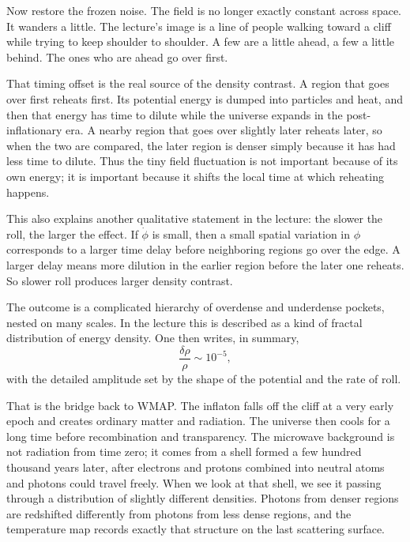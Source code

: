 Now restore the frozen noise. The field is no longer exactly constant across space. It wanders a little. The lecture's image is a line of people walking toward a cliff while trying to keep shoulder to shoulder. A few are a little ahead, a few a little behind. The ones who are ahead go over first.

That timing offset is the real source of the density contrast. A region that goes over first reheats first. Its potential energy is dumped into particles and heat, and then that energy has time to dilute while the universe expands in the post-inflationary era. A nearby region that goes over slightly later reheats later, so when the two are compared, the later region is denser simply because it has had less time to dilute. Thus the tiny field fluctuation is not important because of its own energy; it is important because it shifts the local time at which reheating happens.

This also explains another qualitative statement in the lecture: the slower the roll, the larger the effect. If \(\dot\phi\) is small, then a small spatial variation in \(\phi\) corresponds to a larger time delay before neighboring regions go over the edge. A larger delay means more dilution in the earlier region before the later one reheats. So slower roll produces larger density contrast.

The outcome is a complicated hierarchy of overdense and underdense pockets, nested on many scales. In the lecture this is described as a kind of fractal distribution of energy density. One then writes, in summary,
\begin{equation}
\frac{\delta \rho}{\rho}\sim 10^{-5},
\end{equation}
with the detailed amplitude set by the shape of the potential and the rate of roll.

That is the bridge back to WMAP. The inflaton falls off the cliff at a very early epoch and creates ordinary matter and radiation. The universe then cools for a long time before recombination and transparency. The microwave background is not radiation from time zero; it comes from a shell formed a few hundred thousand years later, after electrons and protons combined into neutral atoms and photons could travel freely. When we look at that shell, we see it passing through a distribution of slightly different densities. Photons from denser regions are redshifted differently from photons from less dense regions, and the temperature map records exactly that structure on the last scattering surface.

